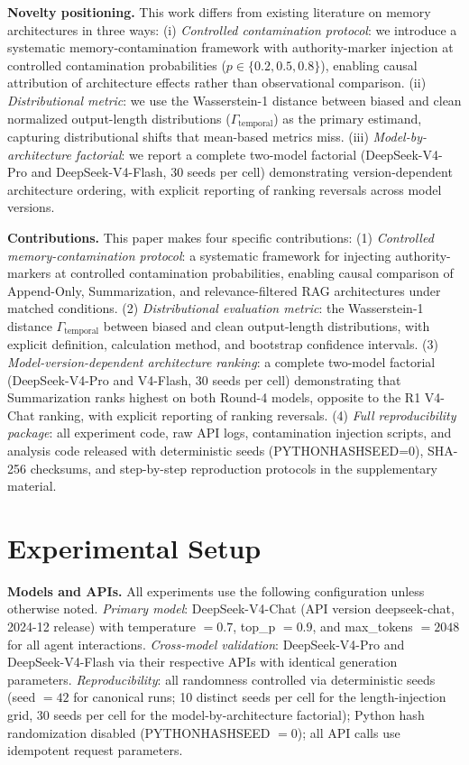 \documentclass[11pt]{article}
\begin{document}


\textbf{Novelty positioning.} This work differs from existing literature on memory architectures in three ways: (i) \emph{Controlled contamination protocol}: we introduce a systematic memory-contamination framework with authority-marker injection at controlled contamination probabilities ($p \in \{0.2, 0.5, 0.8\}$), enabling causal attribution of architecture effects rather than observational comparison. (ii) \emph{Distributional metric}: we use the Wasserstein-1 distance between biased and clean normalized output-length distributions ($\Gamma_{\text{temporal}}$) as the primary estimand, capturing distributional shifts that mean-based metrics miss. (iii) \emph{Model-by-architecture factorial}: we report a complete two-model factorial (DeepSeek-V4-Pro and DeepSeek-V4-Flash, 30 seeds per cell) demonstrating version-dependent architecture ordering, with explicit reporting of ranking reversals across model versions.



\textbf{Contributions.} This paper makes four specific contributions: (1) \emph{Controlled memory-contamination protocol}: a systematic framework for injecting authority-markers at controlled contamination probabilities, enabling causal comparison of Append-Only, Summarization, and relevance-filtered RAG architectures under matched conditions. (2) \emph{Distributional evaluation metric}: the Wasserstein-1 distance $\Gamma_{\text{temporal}}$ between biased and clean output-length distributions, with explicit definition, calculation method, and bootstrap confidence intervals. (3) \emph{Model-version-dependent architecture ranking}: a complete two-model factorial (DeepSeek-V4-Pro and V4-Flash, 30 seeds per cell) demonstrating that Summarization ranks highest on both Round-4 models, opposite to the R1 V4-Chat ranking, with explicit reporting of ranking reversals. (4) \emph{Full reproducibility package}: all experiment code, raw API logs, contamination injection scripts, and analysis code released with deterministic seeds (PYTHONHASHSEED=0), SHA-256 checksums, and step-by-step reproduction protocols in the supplementary material.\section{Experimental Setup}
\label{sec:experimental-setup}

\textbf{Models and APIs.} All experiments use the following configuration unless otherwise noted. \textit{Primary model}: DeepSeek-V4-Chat (API version deepseek-chat, 2024-12 release) with temperature $=0.7$, top\_p $=0.9$, and max\_tokens $=2048$ for all agent interactions. \textit{Cross-model validation}: DeepSeek-V4-Pro and DeepSeek-V4-Flash via their respective APIs with identical generation parameters. \textit{Reproducibility}: all randomness controlled via deterministic seeds (seed $=42$ for canonical runs; 10 distinct seeds per cell for the length-injection grid, 30 seeds per cell for the model-by-architecture factorial); Python hash randomization disabled (PYTHONHASHSEED $=0$); all API calls use idempotent request parameters.
\end{document}
